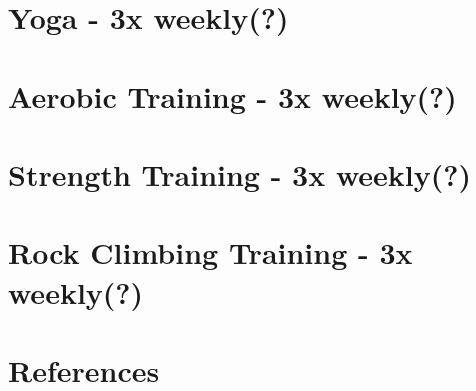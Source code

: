 \documentclass[12pt, letterpaper]{article}
\begin{document}
\newpage %


\section{Yoga - 3x weekly(?)}

\newpage %


\section{Aerobic Training - 3x weekly(?)}

\newpage %


\section{Strength Training - 3x weekly(?)}

\newpage %


\section{Rock Climbing Training - 3x weekly(?)}

\newpage %

\section{References}
\printbibliography[heading=none] 
\end{document}
